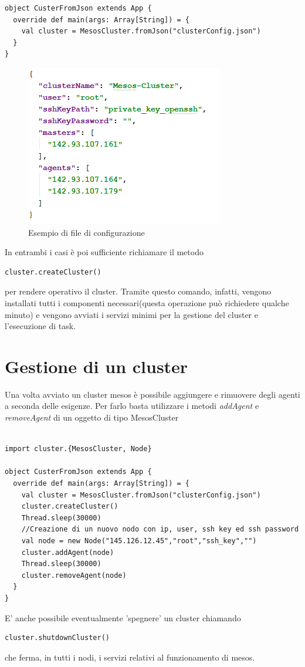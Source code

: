 \documentclass[12pt,a4paper]{article}
\begin{document}
\begin{enumerate}
\begin{lstlisting}[style=myScalastyle]
 object CusterFromJson extends App {
  override def main(args: Array[String]) = {
    val cluster = MesosCluster.fromJson("clusterConfig.json")
  }
}
\end{lstlisting}
\begin{figure}[h!]
\includegraphics[scale=1]{res/esempio_json.png}
\caption{Esempio di file di configurazione}
\label{fig1json}
\end{figure}

\end{enumerate}
In entrambi i casi \`e poi sufficiente richiamare il metodo
\begin{lstlisting}[style=myScalastyle]
cluster.createCluster() 
\end{lstlisting}
 per rendere operativo il cluster. Tramite questo comando, infatti, vengono installati tutti i componenti necessari(questa operazione pu\`o richiedere qualche minuto) e vengono avviati i servizi minimi per la gestione del cluster e l'esecuzione di task.

 
 
\section{Gestione di un cluster}\label{sec:gestioneCluster}

Una volta avviato un cluster mesos \`e possibile aggiungere e rimuovere degli agenti a seconda delle esigenze.
Per farlo basta utilizzare i metodi \textit{addAgent} e \textit{removeAgent} di un oggetto di tipo MesosCluster
 
 \begin{lstlisting}[style=myScalastyle]

import cluster.{MesosCluster, Node}

object CusterFromJson extends App {
  override def main(args: Array[String]) = {
    val cluster = MesosCluster.fromJson("clusterConfig.json")
    cluster.createCluster()
    Thread.sleep(30000)
    //Creazione di un nuovo nodo con ip, user, ssh key ed ssh password
    val node = new Node("145.126.12.45","root","ssh_key","")
    cluster.addAgent(node)
    Thread.sleep(30000)
    cluster.removeAgent(node)
  }
}
\end{lstlisting}
E' anche possibile eventualmente 'spegnere' un cluster chiamando 
\begin{lstlisting}[style=myScalastyle]
cluster.shutdownCluster() 
\end{lstlisting}
che ferma, in tutti i nodi, i servizi relativi al funzionamento di mesos.
\end{document}
